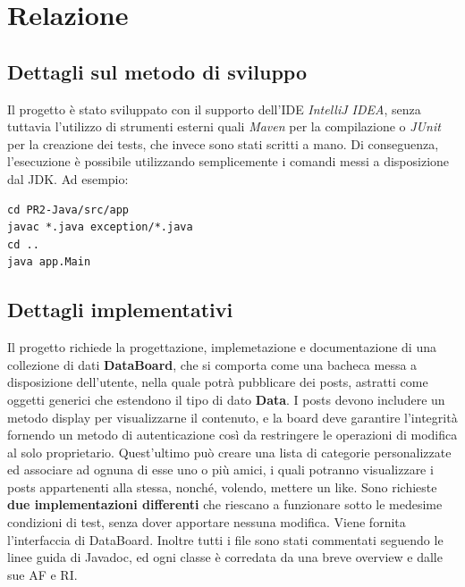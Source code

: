 \documentclass[10pt, italian, openany]{book}
\begin{document}
\chapter*{Relazione}

\section{Dettagli sul metodo di sviluppo}
Il progetto è stato sviluppato con il supporto dell'IDE \textit{IntelliJ IDEA}, senza tuttavia l'utilizzo di strumenti esterni quali \textit{Maven} per la compilazione o \textit{JUnit} per la creazione dei tests, che invece sono stati scritti a mano. Di conseguenza, l'esecuzione è possibile utilizzando semplicemente i comandi messi a disposizione dal JDK. Ad esempio:

\begin{lstlisting}[style=bash]
cd PR2-Java/src/app
javac *.java exception/*.java
cd ..
java app.Main
\end{lstlisting}

\section{Dettagli implementativi}
Il progetto richiede  la progettazione, implemetazione e documentazione di una collezione di dati \textbf{DataBoard}, che si comporta come una bacheca messa a disposizione dell'utente, nella quale potrà pubblicare dei posts, astratti come oggetti generici che estendono il tipo di dato \textbf{Data}. I posts devono includere un metodo display per visualizzarne il contenuto, e la board deve garantire l'integrità fornendo un metodo di autenticazione così da restringere le operazioni di modifica al solo proprietario. Quest'ultimo può creare una lista di categorie personalizzate ed associare ad ognuna di esse uno o più amici, i quali potranno visualizzare i posts appartenenti alla stessa, nonché, volendo, mettere un like. Sono richieste \textbf{due implementazioni differenti} che riescano a funzionare sotto le medesime condizioni di test, senza dover apportare nessuna modifica. Viene fornita l'interfaccia di DataBoard. Inoltre tutti i file sono stati commentati seguendo le linee guida di Javadoc, ed ogni classe è corredata da una breve overview e dalle sue AF e RI.
\end{document}
